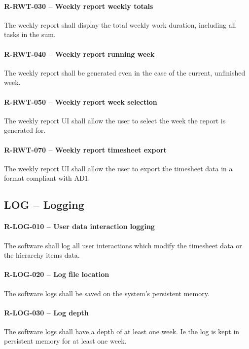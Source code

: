 \paragraph{R-RWT-030 -- Weekly report weekly totals}
The weekly report shall display the total weekly work duration, including
all tasks in the sum.

\paragraph{R-RWT-040 -- Weekly report running week}
The weekly report shall be generated even in the case of the current, unfinished
week.

\paragraph{R-RWT-050 -- Weekly report week selection}
The weekly report \gls{UI} shall allow the user to select the week the report is
generated for.

\paragraph{R-RWT-070 -- Weekly report timesheet export}
The weekly report \gls{UI} shall allow the user to export the timesheet data in
a format compliant with AD1.

\subsection{LOG -- Logging}
\paragraph{R-LOG-010 -- User data interaction logging}
The software shall log all user interactions which modify the timesheet
data or the hierarchy items data.

\paragraph{R-LOG-020 -- Log file location}
The software logs shall be saved on the system's persistent memory.

\paragraph{R-LOG-030 -- Log depth}
The software logs shall have a depth of at least one week. Ie the
log is kept in persistent memory for at least one week.

